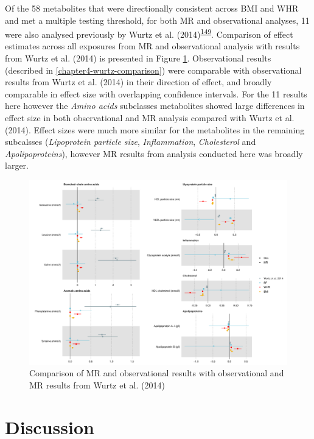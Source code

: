 \documentclass[11pt,twoside]{bristolthesis}
\begin{document}
Of the 58 metabolites that were directionally consistent across BMI and WHR and met a multiple testing threshold, for both MR and observational analyses, 11 were also analysed previously by Wurtz et al. (2014)\textsuperscript{\protect\hyperlink{ref-Wurtz2014}{149}}. Comparison of effect estimates across all exposures from MR and observational analysis with results from Wurtz et al. (2014) is presented in Figure \ref{fig:chapter5-figure-forestplot-directional-consistency-comparison-wurtz}. Observational results (described in \ref{chapter4-wurtz-comparison}) were comparable with observational results from Wurtz et al. (2014) in their direction of effect, and broadly comparable in effect size with overlapping confidence intervals. For the 11 results here however the \emph{Amino acids} subclasses metabolites showed large differences in effect size in both observational and MR analysis compared with Wurtz et al. (2014). Effect sizes were much more similar for the metabolites in the remaining subcalsses (\emph{Lipoprotein particle size}, \emph{Inflammation}, \emph{Cholesterol} and \emph{Apolipoproteins}), however MR results from analysis conducted here was broadly larger.
\begin{figure}
\includegraphics[width=1\linewidth]{data/chapter5/figures/forestplot_sensitivity_directional_consistency_comparison_wurtz} \caption{Comparison of MR and observational results with observational and MR results from Wurtz et al. (2014)}\label{fig:chapter5-figure-forestplot-directional-consistency-comparison-wurtz}
\end{figure}
\hypertarget{discussion}{%
\section{Discussion}\label{discussion}}
\end{document}
